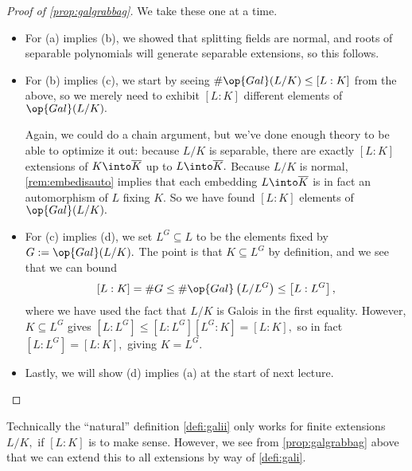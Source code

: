 \documentclass[../notes.tex]{subfiles}
\begin{document}
\begin{proof}[Proof of \autoref{prop:galgrabbag}]
	We take these one at a time.
	\begin{itemize}
		\item For (a) implies (b), we showed that splitting fields are normal, and roots of separable polynomials will generate separable extensions, so this follows.

		\item For (b) implies (c), we start by seeing $\#\op{Gal}(L/K)\le[L:K]$ from the above, so we merely need to exhibit $[L:K]$ different elements of $\op{Gal}(L/K).$
		
		Again, we could do a chain argument, but we've done enough theory to be able to optimize it out: because $L/K$ is separable, there are exactly $[L:K]$ extensions of $K\into\overline K$ up to $L\into\overline K.$ Because $L/K$ is normal, \autoref{rem:embedisauto} implies that each embedding $L\into\overline K$ is in fact an automorphism of $L$ fixing $K.$ So we have found $[L:K]$ elements of $\op{Gal}(L/K).$
		

		\item For (c) implies (d), we set $L^G\subseteq L$ to be the elements fixed by $G:=\op{Gal}(L/K).$ The point is that $K\subseteq L^G$ by definition, and we see that we can bound
		\[[L:K]=\#G\le\#\op{Gal}\left(L/L^G\right)\le\left[L:L^G\right],\]
		where we have used the fact that $L/K$ is Galois in the first equality. However, $K\subseteq L^G$ gives $\left[L:L^G\right]\le\left[L:L^G\right]\left[L^G:K\right]=[L:K],$ so in fact $\left[L:L^G\right]=[L:K],$ giving $K=L^G.$

		\item Lastly, we will show (d) implies (a) at the start of next lecture.
		\qedhere
	\end{itemize}
\end{proof}
\begin{remark}[Nir]
	Technically the ``natural'' definition \autoref{defi:galii} only works for finite extensions $L/K,$ if $[L:K]$ is to make sense. However, we see from \autoref{prop:galgrabbag} above that we can extend this to all extensions by way of \autoref{defi:gali}.
\end{remark}
\end{document}
